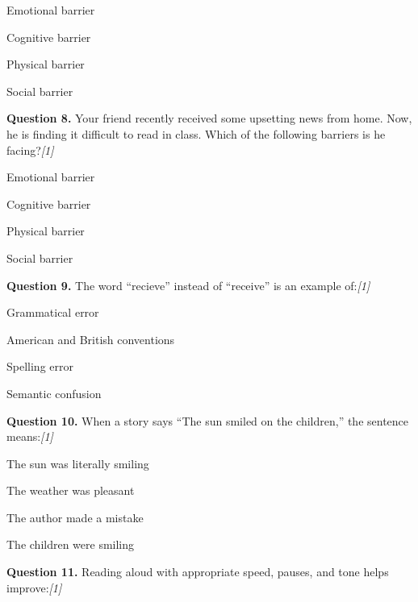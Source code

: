\documentclass[11pt,a4paper]{article}
\newcommand{\pts}[1]{\hfill \textit{[#1]}}
\begin{document}
\begin{parts}
  \item Emotional barrier
  \item Cognitive barrier
  \item Physical barrier
  \item Social barrier
\end{parts}

\medskip




\noindent \textbf{Question 8.} Your friend recently received some upsetting news from home. Now, he is finding it difficult to read in class. Which of the following barriers is he facing?\pts{1}

\begin{parts}
  \item Emotional barrier
  \item Cognitive barrier
  \item Physical barrier
  \item Social barrier
\end{parts}

\medskip




\noindent \textbf{Question 9.} The word ``recieve'' instead of ``receive'' is an example of:\pts{1}

\begin{parts}
  \item Grammatical error
  \item American and British conventions
  \item Spelling error
  \item Semantic confusion
\end{parts}

\medskip




\noindent \textbf{Question 10.} When a story says ``The sun smiled on the children,'' the sentence means:\pts{1}

\begin{parts}
  \item The sun was literally smiling
  \item The weather was pleasant
  \item The author made a mistake
  \item The children were smiling
\end{parts}

\medskip




\noindent \textbf{Question 11.} Reading aloud with appropriate speed, pauses, and tone helps improve:\pts{1}
\end{document}
